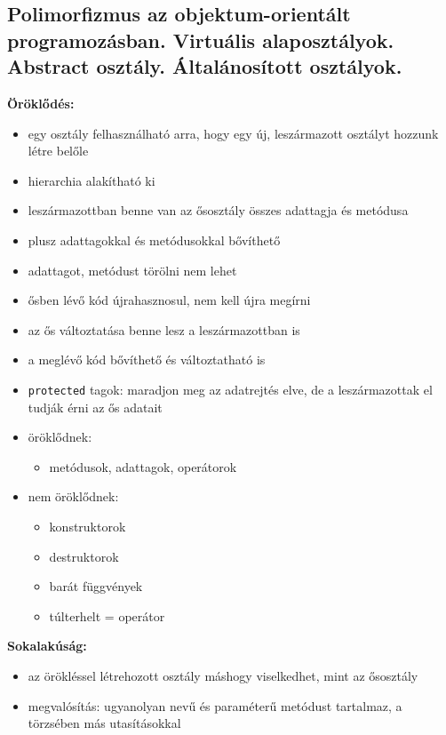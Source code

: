 \subsection{Polimorfizmus az objektum-orientált programozásban. Virtuális alaposztályok. Abstract osztály. Általánosított osztályok.}

\textbf{Öröklődés:}
\begin{itemize}
    \item egy osztály felhasználható arra, hogy egy új, leszármazott osztályt hozzunk létre belőle
    \item hierarchia alakítható ki
    \item leszármazottban benne van az ősosztály összes adattagja és metódusa
    \item plusz adattagokkal és metódusokkal bővíthető
    \item adattagot, metódust törölni nem lehet
    \item ősben lévő kód újrahasznosul, nem kell újra megírni
    \item az ős változtatása benne lesz a leszármazottban is
    \item a meglévő kód bővíthető és változtatható is
    \item \texttt{protected} tagok: maradjon meg az adatrejtés elve, de a leszármazottak el tudják érni az ős adatait
    \item öröklődnek:
    \begin{itemize}
        \item metódusok, adattagok, operátorok
    \end{itemize}
    \item nem öröklődnek:
    \begin{itemize}
        \item konstruktorok
        \item destruktorok
        \item barát függvények
        \item túlterhelt = operátor
    \end{itemize}
\end{itemize}

\textbf{Sokalakúság:}
\begin{itemize}
    \item az örökléssel létrehozott osztály máshogy viselkedhet, mint az ősosztály
    \item megvalósítás: ugyanolyan nevű és paraméterű metódust tartalmaz, a törzsében más utasításokkal
\end{itemize}

